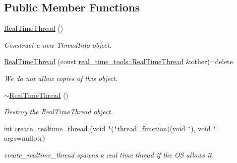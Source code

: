 \subsection*{Public Member Functions}
\begin{DoxyCompactItemize}
\item 
\mbox{\label{classreal__time__tools_1_1RealTimeThread_aca6224b9cbe75e3a85b281e0de096b64}} 
\hyperlink{classreal__time__tools_1_1RealTimeThread_aca6224b9cbe75e3a85b281e0de096b64}{Real\+Time\+Thread} ()
\begin{DoxyCompactList}\small\item\em Construct a new Thread\+Info object. \end{DoxyCompactList}\item 
\mbox{\label{classreal__time__tools_1_1RealTimeThread_a5d2cba4b8f65bdbf36edc0bcc589e45e}} 
\hyperlink{classreal__time__tools_1_1RealTimeThread_a5d2cba4b8f65bdbf36edc0bcc589e45e}{Real\+Time\+Thread} (const \hyperlink{classreal__time__tools_1_1RealTimeThread}{real\+\_\+time\+\_\+tools\+::\+Real\+Time\+Thread} \&other)=delete
\begin{DoxyCompactList}\small\item\em We do not allow copies of this object. \end{DoxyCompactList}\item 
\mbox{\label{classreal__time__tools_1_1RealTimeThread_a8e94b07c6ff51d50b1861887fbd1f69f}} 
\hyperlink{classreal__time__tools_1_1RealTimeThread_a8e94b07c6ff51d50b1861887fbd1f69f}{$\sim$\+Real\+Time\+Thread} ()
\begin{DoxyCompactList}\small\item\em Destroy the \hyperlink{classreal__time__tools_1_1RealTimeThread}{Real\+Time\+Thread} object. \end{DoxyCompactList}\item 
int \hyperlink{classreal__time__tools_1_1RealTimeThread_a232e3955fee6e80c3a7ded68f165414b}{create\+\_\+realtime\+\_\+thread} (void $\ast$($\ast$\hyperlink{realtime__test_8cpp_a54b1343eb90254009bd964c44996761b}{thread\+\_\+function})(void $\ast$), void $\ast$args=nullptr)
\begin{DoxyCompactList}\small\item\em create\+\_\+realtime\+\_\+thread spawns a real time thread if the OS allows it. \end{DoxyCompactList}\item 

\end{DoxyCompactItemize}
